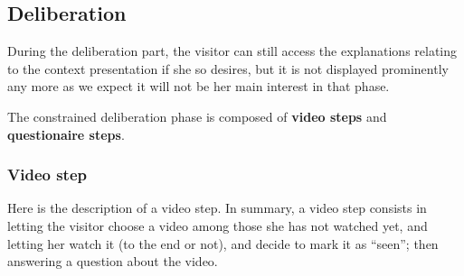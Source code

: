 \documentclass[version=3.21, pagesize, twoside=off, bibliography=totoc, DIV=calc, fontsize=12pt, a4paper]{scrartcl}
\begin{document}
\subsection{Deliberation}
During the deliberation part, the visitor can still access the explanations relating to the context presentation if she so desires, but it is not displayed prominently any more as we expect it will not be her main interest in that phase.

The constrained deliberation phase is composed of \textbf{video steps} and \textbf{questionaire steps}. 

\subsubsection{Video step}
Here is the description of a video step. In summary, a video step consists in letting the visitor choose a video among those she has not watched yet, and letting her watch it (to the end or not), and decide to mark it as “seen”; then answering a question about the video.
\end{document}
